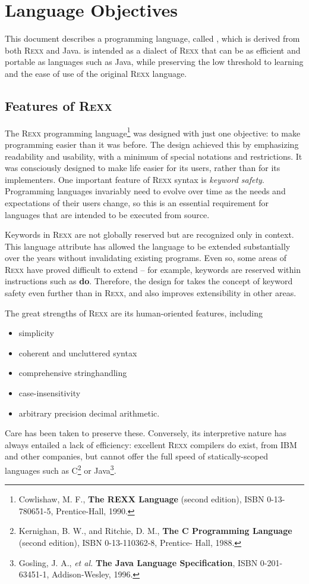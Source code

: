 \section{Language Objectives}
This document describes a programming language, called \nr{}, which
is derived from both R\textsc{exx} and Java. \nr{} is intended as a dialect
of R\textsc{exx} that can be as efficient and portable as languages such as
Java, while preserving the low threshold to learning and the ease of
use of the original R\textsc{exx} language.
\subsection{Features of R\textsc{exx}}
The R\textsc{exx} programming language\footnote{Cowlishaw, M. F., \textbf{The REXX Language} (second edition), ISBN 0-13-780651-5, Prentice-Hall, 1990.} was designed with just one objective: to make programming easier than it was before. The design achieved this by emphasizing readability and usability, with a minimum of special notations and restrictions. It was consciously designed to make life easier for its users, rather than for its implementers.
One important feature of R\textsc{exx} syntax is \emph{keyword
  safety}. Programming languages invariably need to evolve over time
as the needs and expectations of their users change, so this is an
essential requirement for languages that are intended to be executed from source.

Keywords in R\textsc{exx} are not globally reserved but are recognized only in
context. This language attribute has allowed the language to be
extended substantially over the years without invalidating existing
programs. Even so, some areas of R\textsc{exx} have proved difficult to extend
– for example, keywords are reserved within instructions such as
\textbf{do}. Therefore, the design for \nr{} takes the concept of
keyword safety even further than in R\textsc{exx}, and also improves
extensibility in other areas.

The great strengths of R\textsc{exx} are its human-oriented features, including
\begin{itemize}
\item simplicity
\item coherent and uncluttered syntax
\item comprehensive stringhandling
\item case-insensitivity
\item arbitrary precision decimal arithmetic.
\end{itemize}
Care has been taken to preserve these. Conversely, its interpretive
nature has always entailed a lack of efficiency: excellent R\textsc{exx}
compilers do exist, from IBM and other companies, but cannot offer the
full speed of statically-scoped languages such as
C\footnote{Kernighan, B. W., and Ritchie, D. M., \textbf{The C
    Programming Language} (second edition), ISBN 0-13-110362-8,
  Prentice- Hall, 1988.} or Java\footnote{Gosling, J. A., \emph{et
    al.} \textbf{The Java Language Specification}, ISBN 0-201-63451-1,
  Addison-Wesley, 1996.}.
